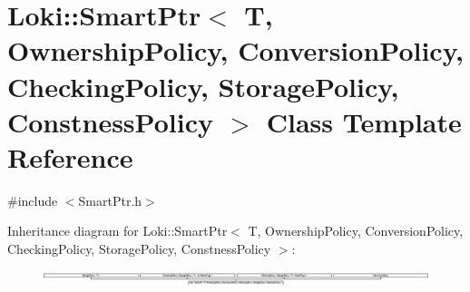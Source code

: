 \hypertarget{classLoki_1_1SmartPtr}{}\section{Loki\+:\+:Smart\+Ptr$<$ T, Ownership\+Policy, Conversion\+Policy, Checking\+Policy, Storage\+Policy, Constness\+Policy $>$ Class Template Reference}
\label{classLoki_1_1SmartPtr}


{\ttfamily \#include $<$Smart\+Ptr.\+h$>$}

Inheritance diagram for Loki\+:\+:Smart\+Ptr$<$ T, Ownership\+Policy, Conversion\+Policy, Checking\+Policy, Storage\+Policy, Constness\+Policy $>$\+:\begin{figure}[H]
\begin{center}
\leavevmode
\includegraphics[height=0.445151cm]{classLoki_1_1SmartPtr}
\end{center}
\end{figure}

